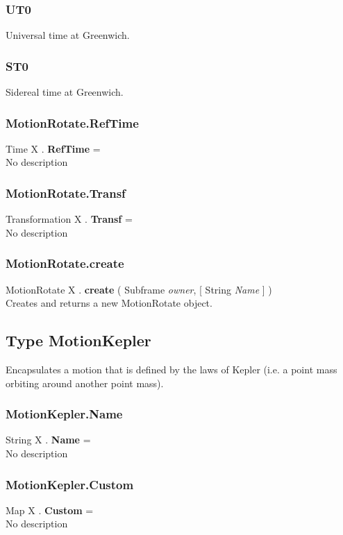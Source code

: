 \subsubsection{UT0 \label{T:TimeType|UT0}}
Universal time at Greenwich.

\subsubsection{ST0 \label{T:TimeType|ST0}}
Sidereal time at Greenwich.

\subsubsection{MotionRotate.RefTime \label{F:MotionRotate:RefTime}}
Time X . \textbf{RefTime} = \\
No description

\subsubsection{MotionRotate.Transf \label{F:MotionRotate:Transf}}
Transformation X . \textbf{Transf} = \\
No description

\subsubsection{MotionRotate.create \label{F:MotionRotate:create}}
MotionRotate X . \textbf{create} ( Subframe \textit{owner},  [ String \textit{Name} ] ) \\
Creates and returns a new MotionRotate object.

\subsection{Type MotionKepler \label{T:MotionKepler}}
Encapsulates a motion that is defined by the laws of Kepler (i.e. a point mass orbiting around another point mass).

\subsubsection{MotionKepler.Name \label{F:MotionKepler:Name}}
String X . \textbf{Name} = \\
No description

\subsubsection{MotionKepler.Custom \label{F:MotionKepler:Custom}}
Map X . \textbf{Custom} = \\
No description

